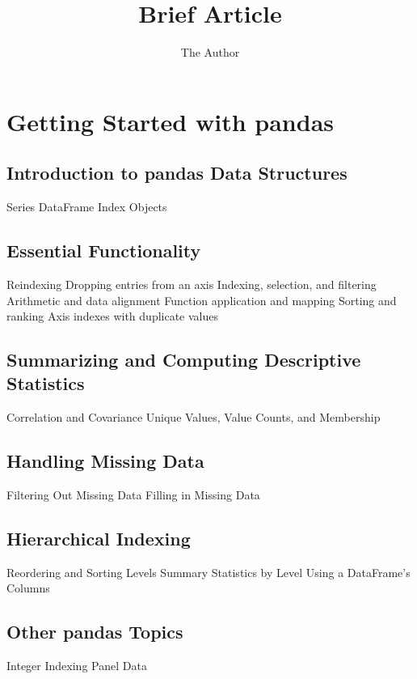 \documentclass[11pt]{article} %
\title{Brief Article}
\author{The Author}
\begin{document}
\section{Getting Started with pandas}   

     
\subsection{Introduction to pandas Data Structures} 
Series 
DataFrame 
Index Objects 


\subsection{Essential Functionality}
Reindexing 
Dropping entries from an axis 
Indexing, selection, and filtering 
Arithmetic and data alignment 
Function application and mapping 
Sorting and ranking 
Axis indexes with duplicate values 


\subsection{Summarizing and Computing Descriptive Statistics} 
Correlation and Covariance 
Unique Values, Value Counts, and Membership 


\subsection{Handling Missing Data}
Filtering Out Missing Data 
Filling in Missing Data 


\subsection{Hierarchical Indexing}
Reordering and Sorting Levels 
Summary Statistics by Level 
Using a DataFrame’s Columns 
\subsection{Other pandas Topics}
Integer Indexing 
Panel Data 
\end{document}
